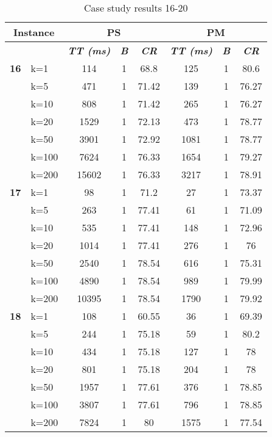     \begin{table}[htbp]
    \caption{Case study results 16-20}
    \centering
    \begin{tabular}{|l|l|c|c|c|c|c|c|}
    \hline
    \multicolumn{ 2}{|c|}{\textbf{Instance}} & \multicolumn{ 3}{c|}{\textbf{PS}} & \multicolumn{ 3}{c|}{\textbf{PM}} \\ \hline
    \multicolumn{ 2}{|l|}{} & \textbf{\textit{TT (ms)}} & \textbf{\textit{B}} & \textbf{\textit{CR}} & \textbf{\textit{TT (ms)}} & \textbf{\textit{B}} & \textbf{\textit{CR}} \\ \hline
    \multicolumn{1}{|r|}{\textbf{16}} & k=1 & 114 & 1 & 68.8 & 125 & 1 & 80.6 \\ 
     & k=5 & 471 & 1 & 71.42 & 139 & 1 & 76.27 \\ 
     & k=10 & 808 & 1 & 71.42 & 265 & 1 & 76.27 \\ 
     & k=20 & 1529 & 1 & 72.13 & 473 & 1 & 78.77 \\ 
     & k=50 & 3901 & 1 & 72.92 & 1081 & 1 & 78.77 \\ 
     & k=100 & 7624 & 1 & 76.33 & 1654 & 1 & 79.27 \\ 
     & k=200 & 15602 & 1 & 76.33 & 3217 & 1 & 78.91 \\ \hline
    \multicolumn{1}{|r|}{\textbf{17}} & k=1 & 98 & 1 & 71.2 & 27 & 1 & 73.37 \\ 
     & k=5 & 263 & 1 & 77.41 & 61 & 1 & 71.09 \\ 
     & k=10 & 535 & 1 & 77.41 & 148 & 1 & 72.96 \\ 
     & k=20 & 1014 & 1 & 77.41 & 276 & 1 & 76 \\ 
     & k=50 & 2540 & 1 & 78.54 & 616 & 1 & 75.31 \\ 
     & k=100 & 4890 & 1 & 78.54 & 989 & 1 & 79.99 \\ 
     & k=200 & 10395 & 1 & 78.54 & 1790 & 1 & 79.92 \\ \hline
    \multicolumn{1}{|r|}{\textbf{18}} & k=1 & 108 & 1 & 60.55 & 36 & 1 & 69.39 \\ 
     & k=5 & 244 & 1 & 75.18 & 59 & 1 & 80.2 \\ 
     & k=10 & 434 & 1 & 75.18 & 127 & 1 & 78 \\ 
     & k=20 & 801 & 1 & 75.18 & 204 & 1 & 78 \\ 
     & k=50 & 1957 & 1 & 77.61 & 376 & 1 & 78.85 \\ 
     & k=100 & 3807 & 1 & 77.61 & 796 & 1 & 78.85 \\ 
     & k=200 & 7824 & 1 & 80 & 1575 & 1 & 77.54 \\ \hline

\end{tabular}
\end{table}
